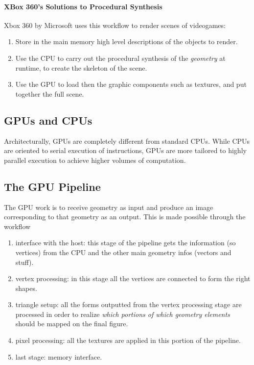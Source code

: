 \documentclass[10pt,a4paper]{article}
\begin{document}
				\paragraph{XBox 360's Solutions to Procedural Synthesis}
					Xbox 360 by Microsoft uses this workflow to render scenes of videogames:
					\begin{enumerate}
						\item Store in the main memory high level descriptions of the objects to render.
						\item Use the CPU to carry out the procedural synthesis of the \emph{geometry} at runtime, to create the skeleton of the scene.
						\item Use the GPU to load then the graphic components such as textures, and put together the full scene.
					\end{enumerate}
			
			\subsection{GPUs and CPUs}
				Architecturally, GPUs are completely different from standard CPUs. While CPUs are oriented to serial execution of instructions, GPUs are more tailored to highly parallel execution to achieve higher volumes of computation.
				
			\subsection{The GPU Pipeline}
				The GPU work is to receive geometry as input and produce an image corresponding to that geometry as an output. This is made possible through the workflow
				\begin{enumerate}
					\item interface with the host: this stage of the pipeline gets the information (so vertices) from the CPU and the other main geometry infos (vectors and stuff).
					\item vertex processing: in this stage all the vertices are connected to form the right shapes. 
					\item triangle setup: all the forms outputted from the vertex processing stage are processed in order to realize \emph{which portions of which geometry elements} should be mapped on the final figure.
					\item pixel processing: all the textures are applied in this portion of the pipeline.
					\item last stage: memory interface. 
				\end{enumerate}
				
		
			
\end{document}
